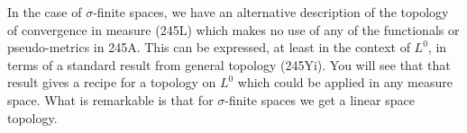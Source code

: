 {In the case of $\sigma$-finite spaces, we have an alternative
description of the topology of convergence in measure (245L) which makes
no use of any of the functionals or pseudo-metrics in 245A.   This can
be expressed, at least in the context of $L^0$, in terms of a standard
result from general topology (245Yi).   You will see that that result
gives a recipe for a topology on $L^0$ which could be applied in any
measure space.   What is remarkable is that for $\sigma$-finite spaces
we get a linear space topology.
}%


\discrpage
